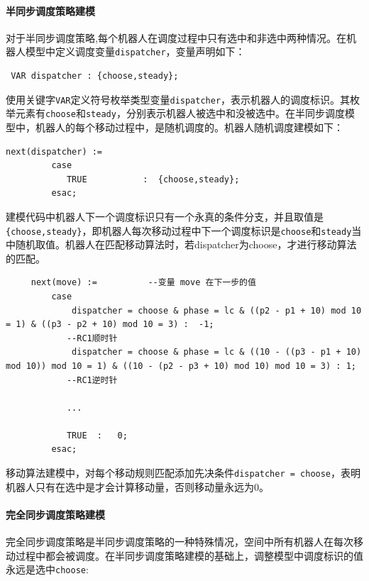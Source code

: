 \paragraph{半同步调度策略建模}
对于半同步调度策略,每个机器人在调度过程中只有选中和非选中两种情况。在机器人模型中定义调度变量\verb|dispatcher|，变量声明如下：

\begin{lstlisting}
 VAR dispatcher : {choose,steady};
\end{lstlisting}

使用关键字\verb|VAR|定义符号枚举类型变量\verb|dispatcher|，表示机器人的调度标识。其枚举元素有\verb|choose|和\verb|steady|，分别表示机器人被选中和没被选中。在半同步调度模型中，机器人的每个移动过程中，是随机调度的。机器人随机调度建模如下：

\begin{lstlisting}
next(dispatcher) :=
         case
            TRUE           :  {choose,steady};
         esac;
\end{lstlisting}

建模代码中机器人下一个调度标识只有一个永真的条件分支，并且取值是\verb|{choose,steady}|，即机器人每次移动过程中下一个调度标识是\verb|choose|和\verb|steady|当中随机取值。机器人在匹配移动算法时，若dispatcher为choose，才进行移动算法的匹配。

\begin{lstlisting}
     next(move) :=          --变量 move 在下一步的值
         case
             dispatcher = choose & phase = lc & ((p2 - p1 + 10) mod 10 = 1) & ((p3 - p2 + 10) mod 10 = 3) :  -1;
            --RC1顺时针
             dispatcher = choose & phase = lc & ((10 - ((p3 - p1 + 10) mod 10)) mod 10 = 1) & ((10 - (p2 - p3 + 10) mod 10) mod 10 = 3) : 1;
            --RC1逆时针

            ...

            TRUE  :   0;
         esac;
\end{lstlisting}

移动算法建模中，对每个移动规则匹配添加先决条件\verb|dispatcher = choose|，表明机器人只有在选中是才会计算移动量，否则移动量永远为0。

\paragraph{完全同步调度策略建模}
完全同步调度策略是半同步调度策略的一种特殊情况，空间中所有机器人在每次移动过程中都会被调度。在半同步调度策略建模的基础上，调整模型中调度标识的值永远是选中\verb|choose|:

